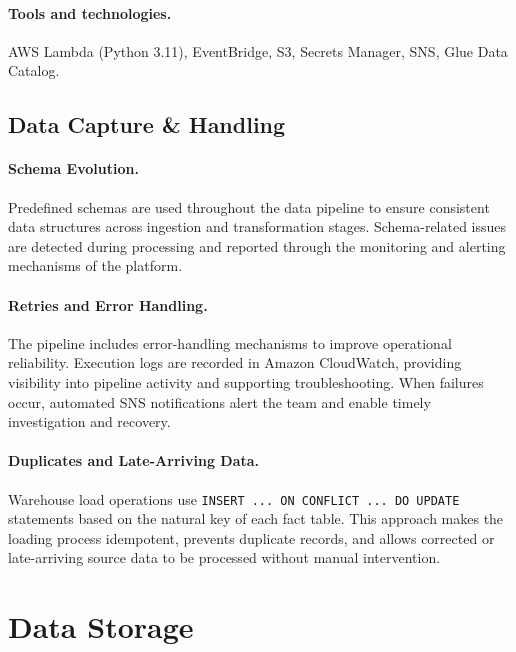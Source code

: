 \documentclass[11pt,a4paper]{article}
\begin{document}
\paragraph{Tools and technologies.}
AWS Lambda (Python 3.11), EventBridge, S3, Secrets
Manager, SNS, Glue Data Catalog.

\subsection{Data Capture \& Handling}
\label{sec:data_capture}

\paragraph{Schema Evolution.}
Predefined schemas are used throughout the data pipeline to ensure
consistent data structures across ingestion and transformation stages.
Schema-related issues are detected during processing and reported
through the monitoring and alerting mechanisms of the platform.

\paragraph{Retries and Error Handling.}
The pipeline includes error-handling mechanisms to improve operational
reliability. Execution logs are recorded in Amazon CloudWatch,
providing visibility into pipeline activity and supporting
troubleshooting. When failures occur, automated SNS notifications alert
the team and enable timely investigation and recovery.

\paragraph{Duplicates and Late-Arriving Data.}
Warehouse load operations use
\texttt{INSERT ... ON CONFLICT ... DO UPDATE} statements based on the
natural key of each fact table. This approach makes the loading process
idempotent, prevents duplicate records, and allows corrected or
late-arriving source data to be processed without manual intervention.

\newpage

\section{Data Storage}
\label{sec:data_storage}
\end{document}

